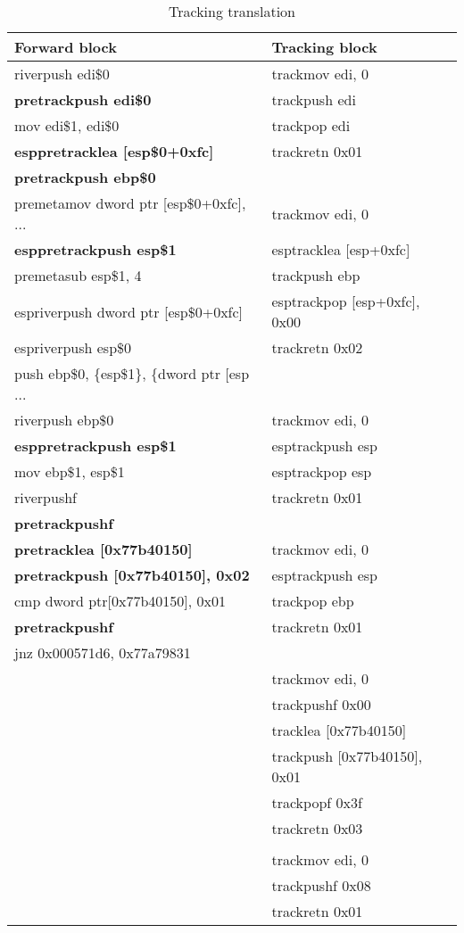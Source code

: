 \documentclass[12pt]{report}
\begin{document}
\begin{table}[H]
	\begin{tabular}{| l | l |}
		\hline
		\textbf{Forward block} & \textbf{Tracking block}\\ \hline
		riverpush edi\$0 & trackmov edi, 0\\
		\textbf{pretrackpush edi\$0} & trackpush edi\\
		mov edi\$1, edi\$0 & trackpop edi\\
		\textbf{esppretracklea [esp\$0+0xfc]} & trackretn 0x01\\
		\textbf{pretrackpush ebp\$0} &\\
		premetamov dword ptr [esp\$0+0xfc], ... & trackmov edi, 0\\
		\textbf{esppretrackpush esp\$1} & esptracklea [esp+0xfc]\\
		premetasub esp\$1, 4 & trackpush ebp\\
		espriverpush dword ptr [esp\$0+0xfc] & esptrackpop [esp+0xfc], 0x00\\
		espriverpush esp\$0 & trackretn 0x02\\
		push ebp\$0, \{esp\$1\}, \{dword ptr [esp ... &\\
		riverpush ebp\$0 & trackmov edi, 0\\
		\textbf{esppretrackpush esp\$1} & esptrackpush esp\\
		mov ebp\$1, esp\$1 & esptrackpop esp\\
		riverpushf & trackretn 0x01\\
		\textbf{pretrackpushf} &\\
		\textbf{pretracklea [0x77b40150]} & trackmov edi, 0\\
		\textbf{pretrackpush [0x77b40150], 0x02} & esptrackpush esp\\
		cmp dword ptr[0x77b40150], 0x01 & trackpop ebp\\
		\textbf{pretrackpushf} & trackretn 0x01\\
		jnz 0x000571d6, 0x77a79831 &\\
		& trackmov edi, 0\\
		& trackpushf 0x00\\
		& tracklea [0x77b40150]\\
		& trackpush [0x77b40150], 0x01\\
		& trackpopf 0x3f\\
		& trackretn 0x03\\
		&\\
		& trackmov edi, 0\\
		& trackpushf 0x08\\
		& trackretn 0x01\\ \hline
	\end{tabular}
	\caption{Tracking translation}
\end{table}
\end{document}
